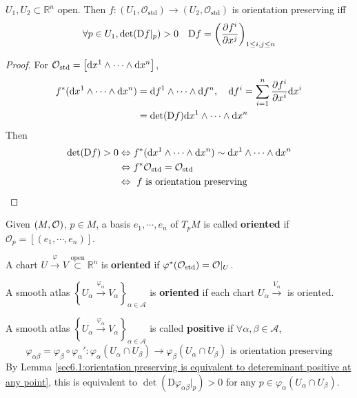 
\begin{lemma}\label{sec6.1:orientation preserving is equivalent to detereminant positive at any point}
    $ U_1,U_2\subset \mathbb R^n $ open. Then  $ f:(U_1,\mathcal{O}_{\mathrm{std}})\rightarrow(U_2,\mathcal{O}_{\mathrm{std}}) $ is orientation preserving iff 
   \begin{equation*}
       \forall p\in  U_1,\det(\mathrm{D}f|_p)>0\quad \mathrm{D}f=\left(\displaystyle\frac{\partial f^i}{\partial x^j}\right)_{1 \leq i,j \leq n}
   \end{equation*} 
\end{lemma}
\begin{proof}
   For  $ \mathcal{O}_{\mathrm{std}}=\left[\mathrm{d} x^1\wedge\cdots\wedge\mathrm{d} x^n\right] $,
   \begin{equation*}
       \begin{aligned}
           f^*(\mathrm{d} {x}^1\wedge\cdots\wedge\mathrm{d} {x}^n)&=\mathrm{d} {f}^1\wedge\cdots\wedge\mathrm{d} {f}^n,\quad \mathrm{d} f^i=\sum_{i=1}^n\frac{\partial f^i}{\partial x^i}\mathrm{d} x^i\\
           &=\det(\mathrm{D}f)\mathrm{d} {x}^1\wedge\cdots\wedge\mathrm{d} {x}^n
       \end{aligned}
   \end{equation*} 
   Then 
   \begin{equation*}
       \begin{aligned}
           \det(\mathrm{D}f)>0&\Leftrightarrow f^*(\mathrm{d} {x}^1\wedge\cdots\wedge\mathrm{d} {x}^n)\sim\mathrm{d} {x}^1\wedge\cdots\wedge\mathrm{d} {x}^n\\
           &\Leftrightarrow f^*\mathcal{O}_{\mathrm{std}}=\mathcal{O}_{\mathrm{std}}\\
           &\Leftrightarrow\text{ $ f $ is orientation preserving }
       \end{aligned}
   \end{equation*}
\end{proof}
Given  $ (M,\mathcal O) $,  $ p\in M $, a basis  $ e_1,\cdots,e_n $ of  $ T_pM $ is called \textbf{oriented} if  $ \mathcal{O}_p=[(e_1,\cdots,e_n)] $.

A chart  $ U\xrightarrow{\varphi}V\overset{\text{open}}{\subset}\mathbb{R}^n $ is \textbf{oriented} if  $ \varphi^*(\mathcal{O}_{\mathrm{std}})=\mathcal{O}|_U $.

A smooth atlas  $ \left\{U_\alpha\xrightarrow{\varphi_\alpha}V_\alpha\right\}_{\alpha\in\mathcal{A}} $ is \textbf{oriented} if each chart  $ U_\alpha\xrightarrow{V_\alpha} $ is oriented.

A smooth atlas  $ \left\{U_\alpha\xrightarrow{\varphi_\alpha}V_\alpha\right\}_{\alpha\in\mathcal{A}}  $ is called \textbf{positive} if  $ \forall \alpha,\beta\in\mathcal{A} $,
\[\varphi_{\alpha\beta}=\varphi_\beta\circ\varphi_\alpha':\varphi_\alpha(U_\alpha\cap U_\beta)\rightarrow\varphi_\beta(U_\alpha\cap U_\beta)\text{ is orientation preserving}\] 
By Lemma \ref{sec6.1:orientation preserving is equivalent to detereminant positive at any point}, this is equivalent to  $ \det(\mathrm{D}\varphi_{\alpha\beta}|_p)>0 $ for any  $ p\in \varphi_\alpha(U_\alpha\cap U_\beta) $.

